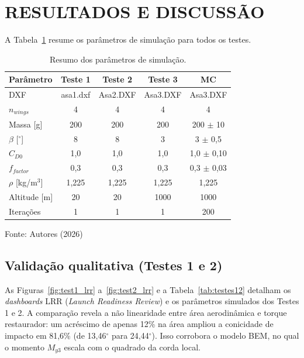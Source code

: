 
\section{RESULTADOS E DISCUSSÃO}

A Tabela~\ref{tab:resumo} resume os parâmetros de simulação para todos os testes.

\begin{table}[htbp]
\caption{Resumo dos parâmetros de simulação.}
\centering
\begin{tabular*}{\textwidth}{@{\extracolsep{\fill}}lcccc}
\hline
Parâmetro & Teste 1 & Teste 2 & Teste 3 & MC \\
\hline
DXF & asa1.dxf & Asa2.DXF & Asa3.DXF & Asa3.DXF \\
$n_{wings}$ & 4 & 4 & 4 & 4 \\
Massa [g] & 200 & 200 & 200 & 200 $\pm$ 10 \\
$\beta$ [$^\circ$] & 8 & 8 & 3 & 3 $\pm$ 0,5 \\
$C_{D0}$ & 1,0 & 1,0 & 1,0 & 1,0 $\pm$ 0,10 \\
$f_{factor}$ & 0,3 & 0,3 & 0,3 & 0,3 $\pm$ 0,03 \\
$\rho$ [kg/m$^3$] & 1,225 & 1,225 & 1,225 & 1,225 \\
Altitude [m] & 20 & 20 & 1000 & 1000 \\
Iterações & 1 & 1 & 1 & 200 \\
\hline
\end{tabular*}
{\footnotesize\centering Fonte: Autores (2026)\par}
\label{tab:resumo}
\end{table}

\subsection{Validação qualitativa (Testes 1 e 2)}

As Figuras~\ref{fig:test1_lrr} a~\ref{fig:test2_lrr} e a Tabela~\ref{tab:testes12} detalham os \textit{dashboards} LRR (\textit{Launch Readiness Review}) e os parâmetros simulados dos Testes 1 e 2. A comparação revela a não linearidade entre área aerodinâmica e torque restaurador: um acréscimo de apenas 12\% na área ampliou a conicidade de impacto em 81,6\% (de 13,46$^\circ$ para 24,44$^\circ$). Isso corrobora o modelo BEM, no qual o momento $M_{y3}$ escala com o quadrado da corda local.

